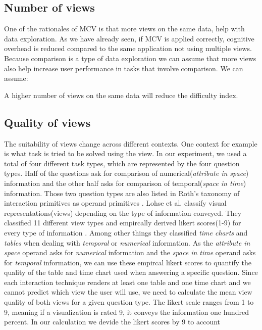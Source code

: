 \subsection{Number of views}
One of the rationales of MCV is that more views on the same data, help with data exploration. As we have already seen, if MCV
is applied correctly, cognitive overhead is reduced compared to the same application not using multiple views.
Because comparison is a type of data exploration we can assume that more views also help increase user performance in tasks
that involve comparison. We can assume:
\begin{statements}
    \item A higher number of views on the same data will reduce the difficulty index.
\end{statements}
\subsection{Quality of views}
The suitability of views change across different contexts. One context for example is what task is tried to be solved
using the view. In our experiment, we used a total of four different task types, which are represented by the four question
types. Half of the questions ask for comparison of numerical(\textit{attribute in space}) information and the other half
asks for comparison of temporal(\textit{space in time}) information. Those two question types are also listed in Roth's taxonomy
of interaction primitives as operand primitives \citep*{Roth.2013}. Lohse et al. classify visual representations(views)
depending on the type of information conveyed. They classified 11 different view types and empircally derived likert
scores(1-9) for every type of information \citep*{Lohse.1994}. Among other things they classified \textit{time charts} and 
\textit{tables} when dealing with \textit{temporal} or \textit{numerical} information. As the \textit{attribute in space} operand
asks for \textit{numerical} information and the \textit{space in time} operand asks for \textit{temporal} information, we can 
use these empircal likert scores to quantify the quality of the table and time chart used when answering a specific question.
Since each interaction technique renders at least one table and one time chart and we cannot predict which view the user will use, we
need to calculate the mean view quality of both views for a given question type. The likert scale ranges from 1 to 9, meaning if a
visualization is rated 9, it conveys the information one hundred percent. In our calculation we devide the likert scores by 9 to account
